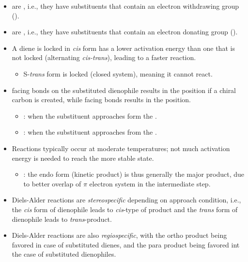\begin{itemize}
\begin{itemize}
      \item {} are , i.e., they have substituents that contain an electron withdrawing group ().
      \item {} are , i.e., they have substituents that contain an electron donating group (). 
      \item A diene is locked in \textit{cis} form has a lower activation energy than one that is not locked (alternating \textit{cis-trans}), leading to a faster reaction.
        \begin{itemize}
          \item S-\textit{trans} form is locked (closed system), meaning it cannot react. 
        \end{itemize}
      \item {} facing bonds on the substituted dienophile results in the  position if a chiral carbon is created, while  facing bonds results in the  position. 
        \begin{itemize}
          \item {}: when the substituent approaches form the .
          \item {}: when the substituent approaches from the . 
        \end{itemize}
      \item Reactions typically occur at moderate temperatures; not much activation energy is needed to reach the more stable state.
        \begin{itemize}
          \item {}: the endo form (kinetic product) is thus generally the major product, due to better overlap of \(\pi \) electron system in the intermediate step.
        \end{itemize}
      \item Diels-Alder reactions are \emph{stereospecific} depending on approach condition, i.e.,  the \textit{cis} form of dienophile leads to \textit{cis}-type of product and the \textit{trans} form of dienophile leads to \textit{trans}-product.
      \item Diels-Alder reactions are also \emph{regiospecific}, with the ortho product being favored in case of substituted dienes, and the para product being favored int the case of substituted dienophiles.
        \begin{itemize}

\end{itemize}
\end{itemize}
\end{itemize}
